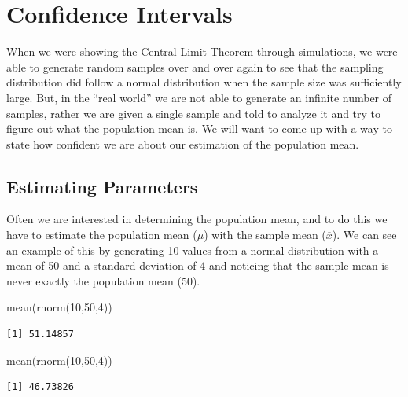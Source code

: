 \documentclass[
  letterpaper,
  DIV=11,
  numbers=noendperiod]{scrreprt}
\newenvironment{Shaded}{\begin{snugshade}}{\end{snugshade}}
\newcommand{\DecValTok}[1]{\textcolor[rgb]{0.68,0.00,0.00}{#1}}
\newcommand{\FunctionTok}[1]{\textcolor[rgb]{0.28,0.35,0.67}{#1}}
\newcommand{\NormalTok}[1]{\textcolor[rgb]{0.00,0.23,0.31}{#1}}
\begin{document}

\chapter{Confidence Intervals}\label{confidence-intervals}

When we were showing the Central Limit Theorem through simulations, we
were able to generate random samples over and over again to see that the
sampling distribution did follow a normal distribution when the sample
size was sufficiently large. But, in the ``real world'' we are not able
to generate an infinite number of samples, rather we are given a single
sample and told to analyze it and try to figure out what the population
mean is. We will want to come up with a way to state how confident we
are about our estimation of the population mean.

\section{Estimating Parameters}\label{estimating-parameters}

Often we are interested in determining the population mean, and to do
this we have to estimate the population mean (\(\mu\)) with the sample
mean (\(\overline{x}\)). We can see an example of this by generating 10
values from a normal distribution with a mean of 50 and a standard
deviation of 4 and noticing that the sample mean is never exactly the
population mean (50).

\begin{Shaded}
\begin{Highlighting}[]
\FunctionTok{mean}\NormalTok{(}\FunctionTok{rnorm}\NormalTok{(}\DecValTok{10}\NormalTok{,}\DecValTok{50}\NormalTok{,}\DecValTok{4}\NormalTok{))}
\end{Highlighting}
\end{Shaded}

\begin{verbatim}
[1] 51.14857
\end{verbatim}

\begin{Shaded}
\begin{Highlighting}[]
\FunctionTok{mean}\NormalTok{(}\FunctionTok{rnorm}\NormalTok{(}\DecValTok{10}\NormalTok{,}\DecValTok{50}\NormalTok{,}\DecValTok{4}\NormalTok{))}
\end{Highlighting}
\end{Shaded}

\begin{verbatim}
[1] 46.73826
\end{verbatim}
\end{document}
